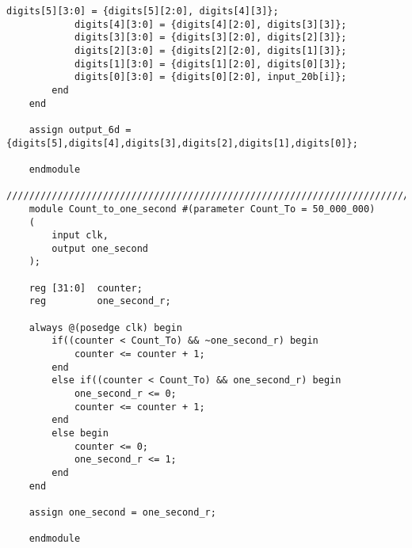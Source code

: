 \begin{lstlisting}[style=verilog]
			digits[5][3:0] = {digits[5][2:0], digits[4][3]};  
			digits[4][3:0] = {digits[4][2:0], digits[3][3]};  
			digits[3][3:0] = {digits[3][2:0], digits[2][3]};    
			digits[2][3:0] = {digits[2][2:0], digits[1][3]};  
			digits[1][3:0] = {digits[1][2:0], digits[0][3]};   
			digits[0][3:0] = {digits[0][2:0], input_20b[i]};   
		end  
	end	   
	 
	assign output_6d ={digits[5],digits[4],digits[3],digits[2],digits[1],digits[0]};   
	
	endmodule 
	/////////////////////////////////////////////////////////////////////////////////////
	module Count_to_one_second #(parameter Count_To = 50_000_000)
	(
		input clk,
		output one_second
	);
	
	reg [31:0]  counter;
	reg         one_second_r;
	
	always @(posedge clk) begin
		if((counter < Count_To) && ~one_second_r) begin
			counter <= counter + 1;
		end
		else if((counter < Count_To) && one_second_r) begin
			one_second_r <= 0;
			counter <= counter + 1;
		end
		else begin
			counter <= 0;
			one_second_r <= 1;
		end
	end
	
	assign one_second = one_second_r;
	
	endmodule
	\end{lstlisting}
	
\ifx\allfiles\undefined

\else
\fi

